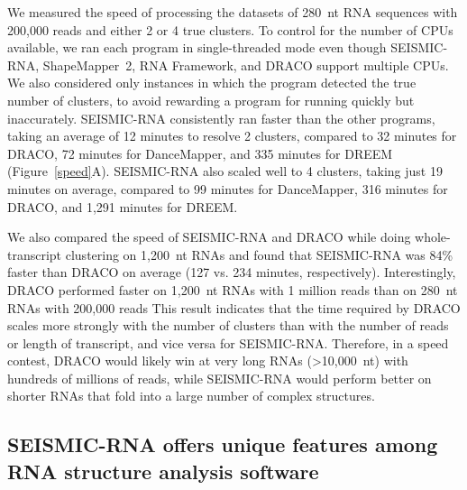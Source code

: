 \documentclass[11pt]{article}
\begin{document}
We measured the speed of processing the datasets of 280~nt RNA sequences with 200,000 reads and either 2 or 4 true clusters.
To control for the number of CPUs available, we ran each program in single-threaded mode even though SEISMIC-RNA, ShapeMapper~2, RNA Framework, and DRACO support multiple CPUs.
We also considered only instances in which the program detected the true number of clusters, to avoid rewarding a program for running quickly but inaccurately.
SEISMIC-RNA consistently ran faster than the other programs, taking an average of 12 minutes to resolve 2 clusters, compared to 32 minutes for DRACO, 72 minutes for DanceMapper, and 335 minutes for DREEM (Figure~\ref{speed}A).
SEISMIC-RNA also scaled well to 4 clusters, taking just 19 minutes on average, compared to 99 minutes for DanceMapper, 316 minutes for DRACO, and 1,291 minutes for DREEM.

We also compared the speed of SEISMIC-RNA and DRACO while doing whole-transcript clustering on 1,200~nt RNAs and found that SEISMIC-RNA was 84\% faster than DRACO on average (127 vs. 234 minutes, respectively).
Interestingly, DRACO performed faster on 1,200~nt RNAs with 1 million reads than on 280~nt RNAs with 200,000 reads
This result indicates that the time required by DRACO scales more strongly with the number of clusters than with the number of reads or length of transcript, and vice versa for SEISMIC-RNA.
Therefore, in a speed contest, DRACO would likely win at very long RNAs (>10,000~nt) with hundreds of millions of reads, while SEISMIC-RNA would perform better on shorter RNAs that fold into a large number of complex structures.


\subsection{SEISMIC-RNA offers unique features among RNA structure analysis software}
\end{document}
